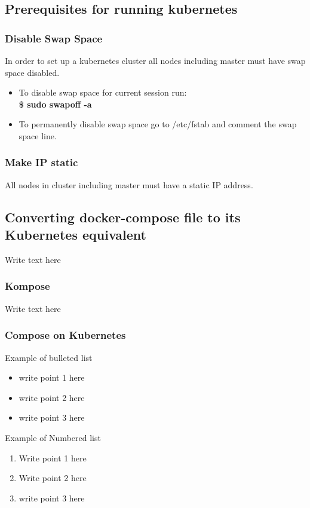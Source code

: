 \documentclass[12pt]{article}
\begin{document}
\subsection{Prerequisites for running kubernetes}
\subsubsection{Disable Swap Space}
In order to set up a kubernetes cluster all nodes including master must have swap space disabled.
\begin{itemize}
	\item To disable swap space for current session run: \\
		  \textbf{\$ sudo swapoff -a}
	\item To permanently disable swap space go to /etc/fstab and comment the swap space line.
\end{itemize}
\subsubsection{Make IP static}
All nodes in cluster including master must have a static IP address.
\subsection{Converting docker-compose file to its Kubernetes equivalent}
Write text here
\subsubsection{Kompose}
Write text here
\subsubsection{Compose on Kubernetes}
Example of bulleted list
\begin{itemize}
 \item write point 1 here \cite{SRS1998}\cite{SimpleCCP-Windows}
 \item write point 2 here
 \item write point 3 here
\end{itemize}

Example of Numbered list
\begin{enumerate}
 \item Write point 1 here
 \item Write point 2 here
 \item write point 3 here
\end{enumerate}
\end{document}
